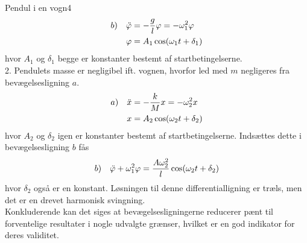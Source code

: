 \begin{opgave}{Pendul i en vogn}{4}
\begin{align*}
	b) \quad \ddot{\varphi} &= -\frac{g}{l}\varphi = -\omega_1^2\varphi \\
\varphi &= A_1\cos(\omega_1t + \delta_1)
\end{align*}
hvor $A_1$ og $\delta_1$ begge er konstanter bestemt af startbetingelserne. \\
2. \quad Pendulets masse er negligibel ift. vognen, hvorfor led med $m$ negligeres fra bevægelsesligning $a$.
\begin{align*}
	a) \quad \ddot{x} &= -\frac{k}{M}x = -\omega_2^2x \\
	x &= A_2\cos(\omega_2t + \delta_2)
\end{align*}
hvor $A_2$ og $\delta_2$ igen er konstanter bestemt af startbetingelserne. Indsættes dette i bevægelsesligning $b$ fås
\begin{align*}
b) \quad \ddot{\varphi} + \omega_1^2\varphi = \frac{A\omega_2^2}{l}\cos(\omega_2t + \delta_2)
\end{align*}
hvor $\delta_2$ også er en konstant. Løsningen til denne differentialligning er træls, men det er en drevet harmonisk svingning. \vspace{2mm}\\
Konkluderende kan det siges at bevægelsesligningerne reducerer pænt til forventelige resultater i nogle udvalgte grænser, hvilket er en god indikator for deres validitet.
\end{opgave}
%
%
